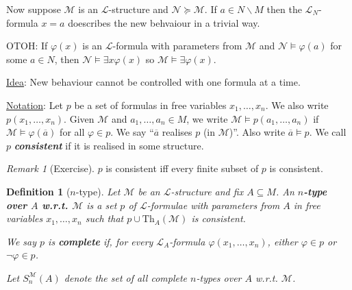 \documentclass[]{article}
\theoremstyle{custhm}
\theoremstyle{cusdef}
\newtheorem{defin}[theorem]{Definition}
\theoremstyle{custhm}
\theoremstyle{custhm}
\theoremstyle{custhm}
\theoremstyle{ex}
\theoremstyle{custhm}
\theoremstyle{cusdef}
\theoremstyle{remark}
\newtheorem*{remark*}{Remark}
\theoremstyle{remark}
\theoremstyle{numremark}
\newcommand{\undf}[1]{\textit{\textbf{#1}}}
\renewcommand{\L}{\mathcal{L}}
\newcommand{\M}{\mathcal{M}}
\renewcommand{\phi}{\varphi}
\renewcommand{\bar}{\overline}
\newcommand{\Th}{\textrm{Th}}
\newcommand{\N}{\mathcal{N}}
\renewcommand{\subset}{\subseteq}
\begin{document}
Now suppose $\M$ is an $\L$-structure and $\N\succeq\M$. If $a\in N\backslash M$ then the $\L_N$-formula $x = a$ doescribes the new behvaiour in a trivial way.

OTOH: If $\phi(x)$ is an $\L$-formula with parameters from $\M$ and $\N\models \phi(a)$ for some $a\in N$, then $\N\models \exists x\phi(x)$ so $\M\models \exists \phi(x)$.

\underline{Idea}: New behaviour cannot be controlled with one formula at a time.

\underline{Notation}: Let $p$ be a set of formulas in free variables $x_1,\dots,x_n$. We also write $p(x_1,\dots,x_n)$. Given $\M$ and $a_1,\dots,a_n\in M$, we write $\M\models p(a_1,\dots,a_n)$ if $\M\models \phi(\bar{a})$ for all $\phi\in p$. We say ``$\bar{a}$ realises $p$ (in $\M$)''. Also write $\bar{a}\models p$. We call $p$ \undf{consistent} if it is realised in some structure.

\begin{remark*}[Exercise]
$p$ is consistent iff every finite subset of $p$ is consistent.
\end{remark*}

\begin{defin}[$n$-type]
Let $\M$ be an $\L$-structure and fix $A\subset M$. An \undf{$n$-type over $A$ w.r.t. $\M$} is a set $p$ of $\L$-formulae with parameters from $A$ in free variables $x_1,\dots,x_n$ such that $p\cup \Th_A(\M)$ is consistent.

We say $p$ is \undf{complete} if, for every $\L_A$-formula $\phi(x_1,\dots,x_n)$, either $\phi \in p$ or $\neg \phi \in p$.

Let $S_n^\M(A)$ denote the set of all complete $n$-types over $A$ w.r.t. $\M$.
\end{defin}
\end{document}
